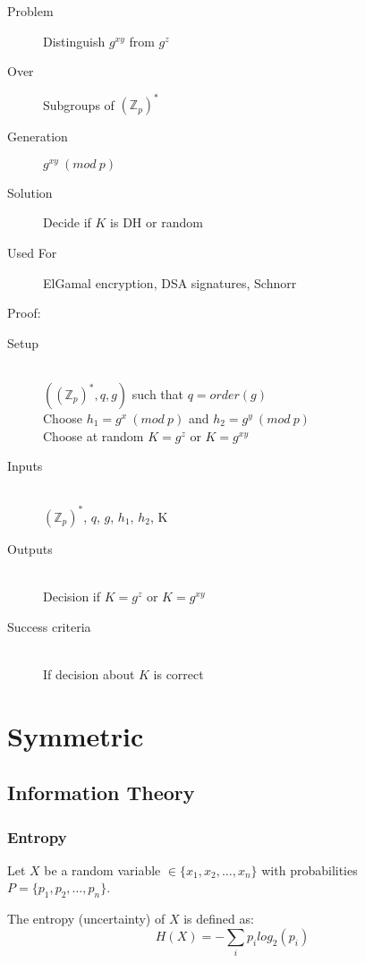 \documentclass[a4paper]{article}
\begin{document}
\begin{description}
  \item[Problem]
    Distinguish $g^{xy}$ from $g^{z}$
  \item[Over]
    Subgroups of $(\mathbb{Z}_{p})^{*}$
  \item[Generation]
    $g^{xy} \: (mod \: p)$
  \item[Solution]
    Decide if $K$ is DH or random
  \item[Used For]
    ElGamal encryption, DSA signatures, Schnorr
\end{description}

Proof:
\begin{description}
  \item[Setup] \hfill \\
    $((\mathbb{Z}_{p})^{*}, q, g)$ such that $q = order(g)$ \\
    Choose $h_{1} = g^{x} \: (mod \: p)$ and $h_{2} = g^{y} \: (mod \: p)$ \\
    Choose at random $K = g^{z}$ or $K = g^{xy}$
  \item[Inputs] \hfill \\
    $(\mathbb{Z}_{p})^{*}$, $q$, $g$, $h_{1}$, $h_{2}$, K
  \item[Outputs] \hfill \\
    Decision if $K = g^{z}$ or $K = g^{xy}$
  \item[Success criteria] \hfill \\
    If decision about $K$ is correct
\end{description}

\section{Symmetric}

\subsection{Information Theory}

\subsubsection{Entropy}

Let $X$ be a random variable $\in \{x_{1}, x_{2}, \ldots,x_{n}\}$ with
probabilities $P = \{p_{1}, p_{2}, \ldots, p_{n}\}$.

The entropy (uncertainty) of $X$ is defined as:
\[
  H(X) = -\sum_{i} p_{i} log_{2}(p_{i})
\]
\end{document}
